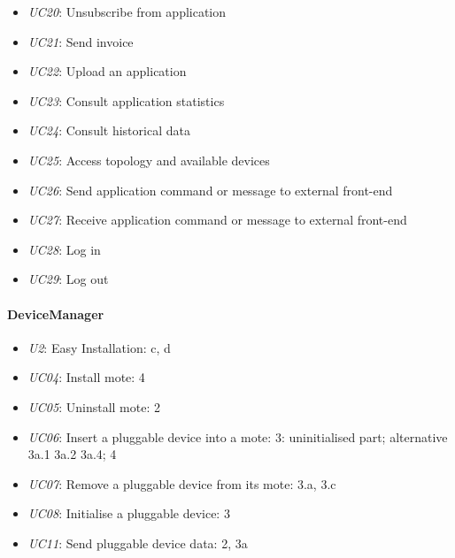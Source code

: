 \begin{itemize}
            \item \emph{UC20}: Unsubscribe from application
            \item \emph{UC21}: Send invoice
            \item \emph{UC22}: Upload an application
            \item \emph{UC23}: Consult application statistics
            \item \emph{UC24}: Consult historical data
            \item \emph{UC25}: Access topology and available devices
            \item \emph{UC26}: Send application command or message to external front-end
            \item \emph{UC27}: Receive application command or message to external front-end
            \item \emph{UC28}: Log in
            \item \emph{UC29}: Log out
        \end{itemize}

    \paragraph{DeviceManager}
        \begin{itemize}
            \item \emph{U2}: Easy Installation: c, d
            \item \emph{UC04}: Install mote: 4
            \item \emph{UC05}: Uninstall mote: 2
            \item \emph{UC06}: Insert a pluggable device into a mote: 3: uninitialised part; alternative 3a.1 3a.2 3a.4; 4
            \item \emph{UC07}: Remove a pluggable device from its mote: 3.a, 3.c
            \item \emph{UC08}: Initialise a pluggable device: 3
            \item \emph{UC11}: Send pluggable device data: 2, 3a
        \end{itemize}
